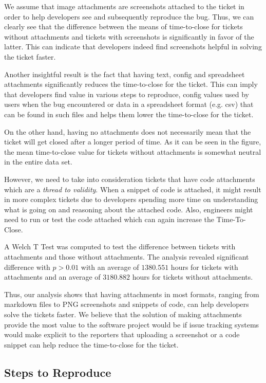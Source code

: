 \documentclass{mpaper}
\begin{document}
We assume that image attachments are screenshots attached to the ticket in order to help developers see and 
subsequently reproduce the bug. Thus, we can clearly see that the difference between the means of time-to-close 
for tickets without attachments and tickets with screenshots is significantly in favor of the latter. This can 
indicate that developers indeed find screenshots helpful in solving the ticket faster.

Another insightful result is the fact that having text, config and spreadsheet attachments significantly 
reduces the time-to-close for the ticket. This can imply that developers find value in various steps to reproduce, 
config values used by users when the bug encountered or data in a spreadsheet format (e.g. csv) that can be 
found in such files and helps them lower the time-to-close for the ticket.

On the other hand, having no attachments does not necessarily mean that the ticket will get closed after 
a longer period of time. As it can be seen in the figure, the mean time-to-close value for tickets without 
attachments is somewhat neutral in the entire data set.

However, we need to take into consideration tickets that have code attachments which are a \emph{thread to validity}. 
When a snippet of code is attached, it might result in more complex tickets due to developers spending more time on 
understanding what is going on and reasoning about the attached code. Also, engineers might need to run or test 
the code attached which can again increase the Time-To-Close.

A Welch T Test was computed to test the difference between tickets with attachments and those 
without attachments. The analysis revealed significant difference with $p > 0.01$ with an
average of $1380.551$ hours for tickets with attachments and an average of $3180.882$ hours
for tickets without attachments. 

Thus, our analysis shows that having attachments in most formats, ranging from markdown files to PNG screenshots 
and snippets of code, can help developers solve the tickets faster. We believe that the solution of making attachments
provide the most value to the software project would be if issue tracking systems would make explicit to the reporters 
that uploading a screenshot or a code snippet can help reduce the time-to-close for the ticket.

\vskip18pt

\subsection{Steps to Reproduce}
\end{document}

